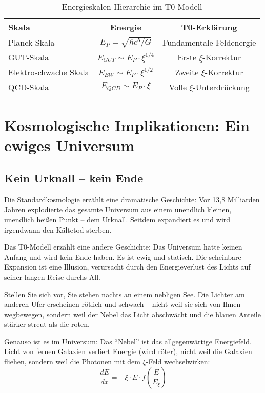 \documentclass[12pt,a4paper]{article}
\newcommand{\xipar}{\ensuremath{\xi}}
\begin{document}
	\begin{table}[H]
		\centering
		\begin{tabular}{lcc}
			\toprule
			\textbf{Skala} & \textbf{Energie} & \textbf{T0-Erklärung} \\
			\midrule
			Planck-Skala & $E_P = \sqrt{\hbar c^5/G}$ & Fundamentale Feldenergie \\
			GUT-Skala & $E_{GUT} \sim E_P \cdot \xipar^{1/4}$ & Erste $\xipar$-Korrektur \\
			Elektroschwache Skala & $E_{EW} \sim E_P \cdot \xipar^{1/2}$ & Zweite $\xipar$-Korrektur \\
			QCD-Skala & $E_{QCD} \sim E_P \cdot \xipar$ & Volle $\xipar$-Unterdrückung \\
			\bottomrule
		\end{tabular}
		\caption{Energieskalen-Hierarchie im T0-Modell}
	\end{table}
	
	\section{Kosmologische Implikationen: Ein ewiges Universum}
	
	\subsection{Kein Urknall -- kein Ende}
	
	Die Standardkosmologie erzählt eine dramatische Geschichte: Vor 13,8 Milliarden Jahren explodierte das gesamte Universum aus einem unendlich kleinen, unendlich heißen Punkt -- dem Urknall. Seitdem expandiert es und wird irgendwann den Kältetod sterben.
	
	Das T0-Modell erzählt eine andere Geschichte: Das Universum hatte keinen Anfang und wird kein Ende haben. Es ist ewig und statisch. Die scheinbare Expansion ist eine Illusion, verursacht durch den Energieverlust des Lichts auf seiner langen Reise durchs All.
	
	\begin{revolutionary}
		Stellen Sie sich vor, Sie stehen nachts an einem nebligen See. Die Lichter am anderen Ufer erscheinen rötlich und schwach -- nicht weil sie sich von Ihnen wegbewegen, sondern weil der Nebel das Licht abschwächt und die blauen Anteile stärker streut als die roten. 
		
		Genauso ist es im Universum: Das ``Nebel'' ist das allgegenwärtige Energiefeld. Licht von fernen Galaxien verliert Energie (wird röter), nicht weil die Galaxien fliehen, sondern weil die Photonen mit dem $\xipar$-Feld wechselwirken:
		\begin{equation}
			\frac{dE}{dx} = -\xipar \cdot E \cdot f\left(\frac{E}{E_\xi}\right)
		\end{equation}
	\end{revolutionary}
	
\end{document}

